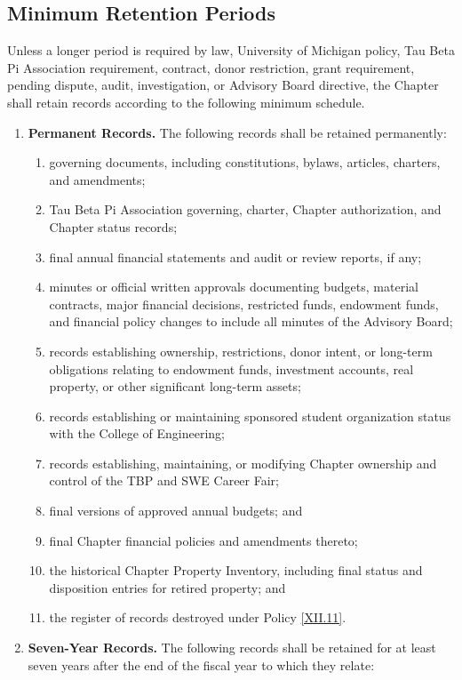 \subsection{Minimum Retention Periods} \label{XII.6}
Unless a longer period is required by law, University of Michigan policy, Tau Beta Pi Association requirement, contract, donor restriction, grant requirement, 
pending dispute, audit, investigation, or Advisory Board directive, the Chapter shall retain records according to the following minimum schedule.
\begin{enumerate}
    \item \textbf{Permanent Records.} The following records shall be retained permanently:
    \begin{enumerate}
        \item governing documents, including constitutions, bylaws, articles, charters, and amendments;
        \item Tau Beta Pi Association governing, charter, Chapter authorization, and Chapter status records;
        \item final annual financial statements and audit or review reports, if any;
        \item minutes or official written approvals documenting budgets, material contracts, major financial decisions, restricted funds, 
        endowment funds, and financial policy changes to include all minutes of the Advisory Board;
        \item records establishing ownership, restrictions, donor intent, or long-term obligations relating to endowment funds, investment accounts, real property, or other significant long-term assets;
        \item records establishing or maintaining sponsored student organization status with the College of Engineering;
        \item records establishing, maintaining, or modifying Chapter ownership and control of the TBP and SWE Career Fair;
        \item final versions of approved annual budgets; and
        \item final Chapter financial policies and amendments thereto;
        \item the historical Chapter Property Inventory, including final status and disposition entries for retired property; and
        \item the register of records destroyed under Policy \ref{XII.11}.
    \end{enumerate}
    \item \textbf{Seven-Year Records.} The following records shall be retained for at least seven years after the end of the fiscal year to which they relate:

\end{enumerate}
